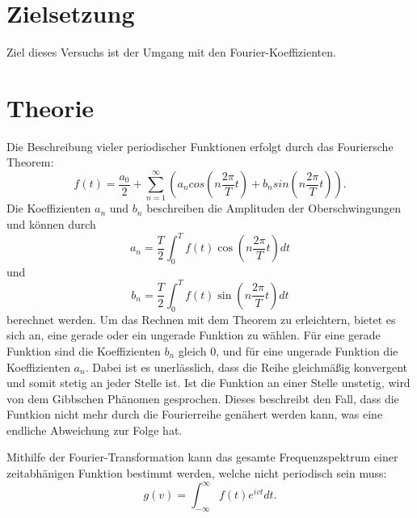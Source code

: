 \section{Zielsetzung}
Ziel dieses Versuchs ist der Umgang mit den Fourier-Koeffizienten.
\section{Theorie}
Die Beschreibung vieler periodischer Funktionen erfolgt durch das Fouriersche Theorem:
\begin{equation}
f(t) = \frac{a_0}{2} + \sum_{n=1}^\infty (a_n cos(n\frac{2\pi}{T}t) + b_n sin(n\frac{2\pi}{T}t)).
\end{equation}
Die Koeffizienten $a_n$ und $b_n$ beschreiben die Amplituden der Oberschwingungen und können durch
\begin{equation}
a_n = \frac{T}{2}\int_{0}^{T} f(t) \cos(n\frac{2\pi}{T}t) dt
\end{equation}
und
\begin{equation}
b_n = \frac{T}{2}\int_{0}^{T} f(t) \sin(n\frac{2\pi}{T}t) dt
\end{equation}
berechnet werden.
Um das Rechnen mit dem Theorem zu erleichtern, bietet es sich an, eine gerade oder ein ungerade
Funktion zu wählen. Für eine gerade Funktion sind die Koeffizienten $b_n$ gleich 0, und für eine ungerade Funktion
die Koeffizienten $a_n$.
Dabei ist es unerlässlich, dass die Reihe gleichmäßig konvergent und somit stetig an jeder Stelle ist.
Ist die Funktion an einer Stelle unstetig, wird von dem Gibbschen Phänomen gesprochen. Dieses beschreibt den Fall,
dass die Funtkion nicht mehr durch die Fourierreihe genähert werden kann, was eine endliche Abweichung zur Folge hat.

Mithilfe der Fourier-Transformation kann das gesamte Frequenzspektrum einer zeitabhänigen Funktion
bestimmt werden, welche nicht periodisch sein muss:
\begin{equation}
g(v) = \int_{-\infty}^{\infty} f(t) e^{ivt} dt.
\end{equation}
